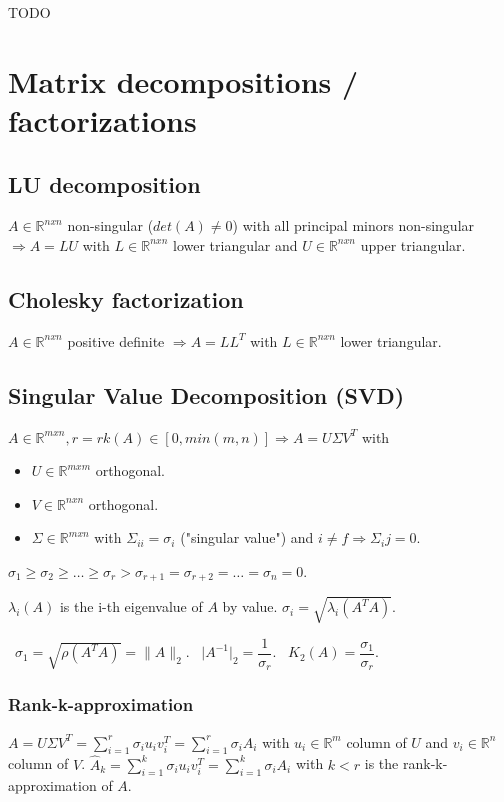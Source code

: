 \documentclass[]{article}
\begin{document}
	TODO
	
	\section{Matrix decompositions / factorizations}
	
	\subsection{LU decomposition}
	
	$A \in \mathbb{R}^{nxn} $ non-singular ($det(A)\ne0$) with all principal minors non-singular $\Rightarrow A = L U$ with $L \in \mathbb{R}^{nxn}$ lower triangular and $U \in \mathbb{R}^{nxn}$ upper triangular.
	
	\subsection{Cholesky factorization}
	
	$A \in \mathbb{R}^{nxn} $ positive definite $\Rightarrow A = L L^T$ with $L \in \mathbb{R}^{nxn}$ lower triangular.
	
	\subsection{Singular Value Decomposition (SVD)}
	
	$A \in \mathbb{R}^{mxn}, r = rk(A)\in[0,min(m,n)] \Rightarrow A = U \Sigma V^T$ with 
	\begin{itemize}
		\item $U\in\mathbb{R}^{mxm}$ orthogonal.
		\item $V\in\mathbb{R}^{nxn}$ orthogonal.
		\item $\Sigma \in\mathbb{R}^{mxn}$ with $\Sigma_{ii}=\sigma_i$ ("singular value") and $i \ne f \Rightarrow \Sigma_ij=0$.
	\end{itemize}
	$\sigma_1 \ge \sigma_2 \ge \ldots \ge \sigma_r > \sigma_{r+1} = \sigma_{r+2} = \ldots = \sigma_n = 0$.

	$\lambda_i(A)$ is the i-th eigenvalue of $A$ by value. $\sigma_i = \sqrt{\lambda_i(A^T A)}$.
	
	\ $\sigma_1 = \sqrt{\rho(A^T A)} = \lVert A \lVert_2$.
	\ $\lvert A^{-1} \lvert_2 = \dfrac{1}{\sigma_r}$.
	\ $K_2(A) = \dfrac{\sigma_1}{\sigma_r}$.
	
	\subsubsection{Rank-k-approximation}
	$A = U \Sigma V^T = \sum_{i=1}^{r} \sigma_i u_i v_i^T = \sum_{i=1}^r \sigma_i A_i$ with $u_i \in \mathbb{R}^m$ column of $U$ and $v_i \in \mathbb{R}^n$ column of $V$.
	$\hat{A}_k = \sum_{i=1}^k \sigma_i u_i v_i^T = \sum_{i=1}^k \sigma_i A_i$ with $k < r$ is the rank-k-approximation of $A$.
	
\end{document}
